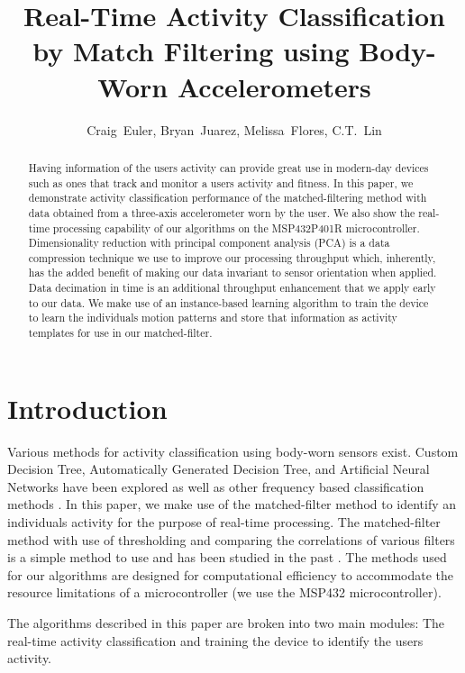 \documentclass[journal]{IEEEtran}
\begin{document}
%
\title{Real-Time Activity Classification by Match Filtering using Body-Worn Accelerometers}
%
\author{Craig~Euler, Bryan~Juarez, Melissa~Flores, C.T.~Lin}
%
\maketitle
%
\begin{abstract}
Having information of the user\textquotesingle s activity can provide great use in modern-day devices such as ones that track and monitor a user\textquotesingle s activity and fitness.
In this paper, we demonstrate activity classification performance of the matched-filtering method with data obtained from a three-axis accelerometer worn by the user.
We also show the real-time processing capability of our algorithms on the MSP432P401R microcontroller.
Dimensionality reduction with principal component analysis (PCA) \cite{bishop_2006} is a data compression technique we use to improve our processing throughput which, inherently, has the added benefit of making our data invariant to sensor orientation when applied.
Data decimation in time is an additional throughput enhancement that we apply early to our data.
We make use of an instance-based learning algorithm to train the device to learn the individual\textquotesingle s motion patterns and store that information as activity templates for use in our matched-filter.
\end{abstract}
%
\section{Introduction}
Various methods for activity classification using body-worn sensors exist.
Custom Decision Tree, Automatically Generated Decision Tree, and Artificial Neural Networks \cite{parkka_ermes_korpipaa_mantyjarvi_peltola_korhonen_2006} have been explored as well as other frequency based classification methods \cite{sharma_purwar_lee_lee_chung_2008}.
In this paper, we make use of the matched-filter method to identify an individual\textquotesingle s activity for the purpose of real-time processing.
The matched-filter method with use of thresholding and comparing the correlations of various filters is a simple method to use and has been studied in the past \cite{giannakis_tsatsanis_1990}.
The methods used for our algorithms are designed for computational efficiency to accommodate the resource limitations of a microcontroller (we use the MSP432 microcontroller).

The algorithms described in this paper are broken into two main modules: The real-time activity classification and training the device to identify the user\textquotesingle s activity.
\end{document}
